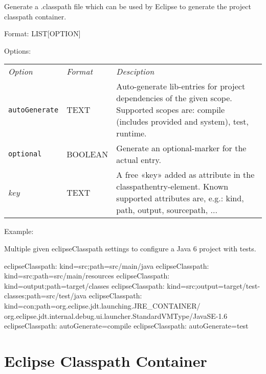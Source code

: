 \documentclass[a4paper,12pt,english,oneside,halfparskip]{scrartcl}
\newcommand{\G}{\par\noindent\ensuremath{\blacktriangleright}~}
\newcommand{\code}[1]{\texttt{#1}}
\begin{document}
Generate a .classpath file which can be used by Eclipse to generate the project classpath container.

Format: LIST[OPTION]

Options:

\begin{tabular}{llp{}}
\emph{Option} & \emph{Format} & \emph{Desciption} \\
\code{autoGenerate} &  TEXT & Auto-generate lib-entries for project dependencies of the given scope. Supported scopes are: compile (includes provided and system), test, runtime. \\
\code{optional} & BOOLEAN & Generate an optional-marker for the actual entry. \\
\emph{key} &  TEXT & A free «key» added as attribute in the classpathentry-element. Known supported attributes are, e.g.: kind, path, output, sourcepath, ... \\
\end{tabular}

Example:

Multiple given eclipseClasspath settings to configure a Java 6 project with tests.

\begin{Cmdline}
eclipseClasspath: kind=src;path=src/main/java
eclipseClasspath: kind=src;path=src/main/resources
eclipseClasspath: kind=output;path=target/classes
eclipseClasspath: kind=src;output=target/test-classes;path=src/test/java
eclipseClasspath: kind=con;path=org.eclipse.jdt.launching.JRE_CONTAINER/\\
org.eclipse.jdt.internal.debug.ui.launcher.StandardVMType/JavaSE-1.6
eclipseClasspath: autoGenerate=compile
eclipseClasspath: autoGenerate=test
\end{Cmdline}




% 
% 
% 

\section{Eclipse Classpath Container}
\end{document}

